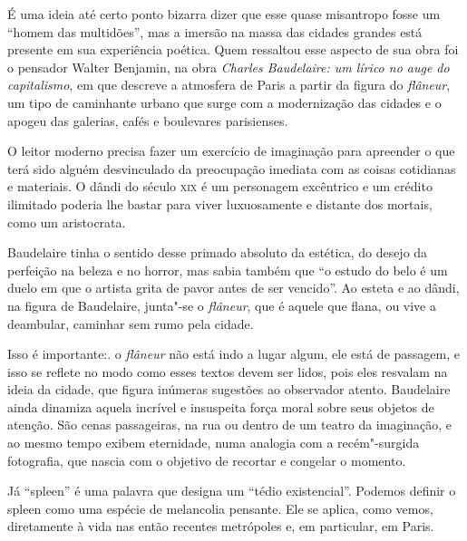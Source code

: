 \documentclass[12pt]{extarticle}
\begin{document}


É uma ideia até certo ponto bizarra dizer que esse quase misantropo
fosse um ``homem das multidões'', mas a imersão na massa das cidades
grandes está presente em sua experiência poética.
Quem ressaltou esse aspecto de sua obra foi o pensador Walter Benjamin,
na obra \textit{Charles Baudelaire: um lírico no auge do capitalismo}, em
que descreve a atmosfera de Paris a partir da figura do \textit{flâneur}, um
tipo de caminhante urbano que surge com a modernização das cidades e o
apogeu das galerias, cafés e boulevares parisienses.




O leitor moderno precisa fazer um exercício de imaginação para apreender
o que terá sido alguém desvinculado da preocupação imediata com as
coisas cotidianas e materiais.
O dândi do século \textsc{xix} é um personagem excêntrico e um crédito
ilimitado poderia lhe bastar para viver luxuosamente e distante dos
mortais, como um aristocrata.

Baudelaire tinha o sentido desse primado absoluto da estética, do
desejo da perfeição na beleza e no horror, mas sabia também que ``o
estudo do belo é um duelo em que o artista grita de pavor antes de ser
vencido''.
Ao esteta e ao dândi, na figura de Baudelaire, junta"-se o \textit{flâneur},
que é aquele que flana, ou vive a deambular, caminhar sem rumo pela
cidade.

Isso é importante:. o \textit{flâneur} não está indo a lugar algum, ele está de
passagem, e isso se reflete no modo como esses textos devem ser lidos,
pois eles resvalam na ideia da cidade, que figura inúmeras sugestões ao observador atento.
Baudelaire ainda dinamiza aquela incrível e insuspeita força moral sobre
seus objetos de atenção.
São cenas passageiras, na rua ou dentro de um teatro da imaginação, e
ao mesmo tempo exibem eternidade, numa analogia com a recém"-surgida
fotografia, que nascia com o objetivo de recortar e congelar o
momento.

Já ``spleen'' é uma palavra que designa um ``tédio existencial''.
Podemos definir o spleen como uma espécie de melancolia pensante.
Ele se aplica, como vemos, diretamente à vida nas então recentes
metrópoles e, em particular, em Paris.
\end{document}
